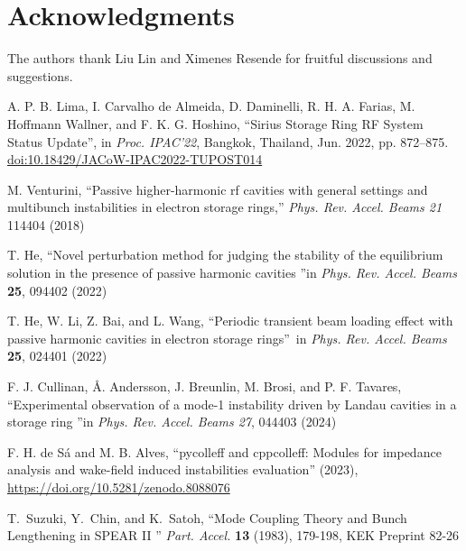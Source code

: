 \documentclass[a4paper,
               biblatex,     %
               ]{jacow}
\begin{document}
\section{Acknowledgments}
The authors thank Liu Lin and Ximenes Resende for fruitful discussions and suggestions.
%
%
%
	{\printbibliography}%
	{%
	
	\begin{thebibliography}{9} %

   A. P. B. Lima, I. Carvalho de Almeida, D. Daminelli, R. H. A. Farias, M. Hoffmann Wallner, and F. K. G. Hoshino,
   \textquotedblleft{Sirius Storage Ring RF System Status Update}\textquotedblright,
   in \emph{Proc. IPAC’22}, Bangkok, Thailand, Jun. 2022, pp. 872--875.
   \url{doi:10.18429/JACoW-IPAC2022-TUPOST014}

    M. Venturini,
    ``Passive higher-harmonic rf cavities with general settings and multibunch instabilities in electron storage rings,''
    \emph{Phys. Rev. Accel. Beams 21} 114404 (2018)

    T. He,
    \textquotedblleft Novel perturbation method for judging the stability of the equilibrium solution in the presence of passive harmonic cavities \textquotedblright in
    \emph{Phys. Rev. Accel. Beams} \textbf{25}, 094402 (2022)

    T. He, W. Li, Z. Bai, and L. Wang,
    \textquotedblleft Periodic transient beam loading effect with passive harmonic cavities in electron storage rings\textquotedblright~in \emph{Phys. Rev. Accel. Beams} \textbf{25}, 024401 (2022)
    
    F. J. Cullinan, \AA{}. Andersson, J. Breunlin, M. Brosi, and P. F. Tavares,
    \textquotedblleft Experimental observation of a mode-1 instability driven by Landau cavities in a storage ring \textquotedblright in \emph{Phys. Rev. Accel. Beams 27}, 044403 (2024)

    F. H. de Sá and M. B. Alves,
    ``pycolleff and cppcolleff: Modules for impedance analysis and wake-field induced instabilities evaluation'' (2023),
    \url{https://doi.org/10.5281/zenodo.8088076}

    T.~Suzuki, Y.~Chin, and K.~Satoh,
    \textquotedblleft Mode Coupling Theory and Bunch Lengthening in {SPEAR} {II} \textquotedblright
    \emph{Part. Accel.} \textbf{13} (1983), 179-198,
    KEK Preprint 82-26


\end{thebibliography}}
\end{document}
